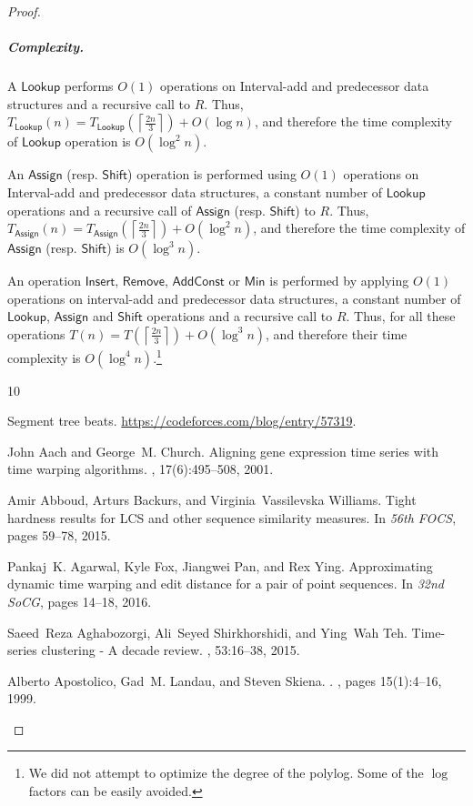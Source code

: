 \documentclass[10pt,a4paper]{article}
\newcommand{\AssignOp}{\mathsf{Assign}}
\newcommand{\ShiftOp}{\mathsf{Shift}}
\newcommand{\Insert}{\mathsf{Insert}}
\newcommand{\Remove}{\mathsf{Remove}}
\newcommand{\Lookup}{\mathsf{Lookup}}
\newcommand{\Add}{\mathsf{AddConst}}
\newcommand{\Min}{\mathsf{Min}}
\newcommand{\para}[1]{\vspace{-0.1in} \subparagraph*{#1}}
\newcommand{\ceil}[1]{\left\lceil{#1}\right\rceil}
\begin{document}
\begin{proof}
\para{Complexity.}
A $\Lookup$ performs $O(1)$ operations on Interval-add and predecessor data structures and a recursive call to $R$. 
Thus, $T_{\Lookup}(n)=T_{\Lookup}(\ceil{\frac{2n}{3}})+O(\log n)$, and therefore the time complexity of $\Lookup$ operation is $O(\log^2 n)$.

An $\AssignOp$ (resp. $\ShiftOp$) operation is performed using $O(1)$ operations on Interval-add and predecessor data structures, a constant number of $\Lookup$ operations and a recursive call of $\AssignOp$ (resp. $\ShiftOp$) to $R$. 
Thus, $T_{\AssignOp}(n) =T_{\AssignOp}(\ceil{\frac{2n}{3}})+O(\log^2 n)$, and therefore the time complexity of $\AssignOp$ (resp. $\ShiftOp$) is $O(\log^3 n)$.

An operation $\Insert$, $\Remove$, $\Add$ or $\Min$ is performed by applying $O(1)$ operations on interval-add and predecessor data structures, a constant number of $\Lookup$, $\AssignOp$ and $\ShiftOp$ operations and a recursive call to $R$. 
Thus, for all these operations $T(n)=T(\ceil{\frac{2n}{3}})+O(\log^3 n)$, and therefore their time complexity is $O(\log^4 n)$.\footnote{We did not attempt to optimize the degree of the polylog. Some of the $\log$ factors can be easily avoided.}


\begin{thebibliography}{10}

Segment tree beats.
\newblock \url{https://codeforces.com/blog/entry/57319}.

John Aach and George~M. Church.
\newblock Aligning gene expression time series with time warping algorithms.
, 17(6):495--508, 2001.

Amir Abboud, Arturs Backurs, and Virginia~Vassilevska Williams.
\newblock Tight hardness results for {LCS} and other sequence similarity
  measures.
\newblock In {\em 56th {FOCS}}, pages 59--78, 2015.

Pankaj~K. Agarwal, Kyle Fox, Jiangwei Pan, and Rex Ying.
\newblock Approximating dynamic time warping and edit distance for a pair of
  point sequences.
\newblock In {\em 32nd {S}o{CG}}, pages 14--18, 2016.

Saeed~Reza Aghabozorgi, Ali~Seyed Shirkhorshidi, and Ying~Wah Teh.
\newblock Time-series clustering - {A} decade review.
, 53:16--38, 2015.

Alberto Apostolico, Gad~M. Landau, and Steven Skiena.
.
, pages 15(1):4--16, 1999.


\end{thebibliography}
\end{proof}
\end{document}
